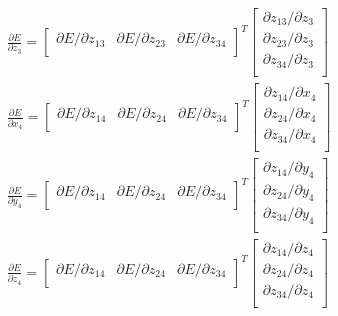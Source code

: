 \documentclass{article}
\begin{document}
\begin{eqnarray}
\frac{\partial{E}}{\partial{z_3}} = \left[\begin{array}{ccc}
	\partial{E} / \partial{z_{13}} &
	\partial{E} / \partial{z_{23}} &
	\partial{E} / \partial{z_{34}} \\
\end{array}
\right]^T
\left[\begin{array}{c}
	\partial{z_{13}} / \partial{z_{3}} \\
	\partial{z_{23}} / \partial{z_{3}} \\
	\partial{z_{34}} / \partial{z_{3}} \\
\end{array}
\right] \\ %
\frac{\partial{E}}{\partial{x_4}} = \left[\begin{array}{ccc}
	\partial{E} / \partial{z_{14}} &
	\partial{E} / \partial{z_{24}} &
	\partial{E} / \partial{z_{34}} \\
\end{array}
\right]^T
\left[\begin{array}{c}
	\partial{z_{14}} / \partial{x_{4}} \\
	\partial{z_{24}} / \partial{x_{4}} \\
	\partial{z_{34}} / \partial{x_{4}} \\
\end{array}
\right] \\ %
\frac{\partial{E}}{\partial{y_4}} = \left[\begin{array}{ccc}
	\partial{E} / \partial{z_{14}} &
	\partial{E} / \partial{z_{24}} &
	\partial{E} / \partial{z_{34}} \\
\end{array}
\right]^T
\left[\begin{array}{c}
	\partial{z_{14}} / \partial{y_{4}} \\
	\partial{z_{24}} / \partial{y_{4}} \\
	\partial{z_{34}} / \partial{y_{4}} \\
\end{array}
\right] \\ %
\frac{\partial{E}}{\partial{z_4}} = \left[\begin{array}{ccc}
	\partial{E} / \partial{z_{14}} &
	\partial{E} / \partial{z_{24}} &
	\partial{E} / \partial{z_{34}} \\
\end{array}
\right]^T
\left[\begin{array}{c}
	\partial{z_{14}} / \partial{z_{4}} \\
	\partial{z_{24}} / \partial{z_{4}} \\
	\partial{z_{34}} / \partial{z_{4}} \\
\end{array}
\right]
\end{eqnarray}
\end{document}

